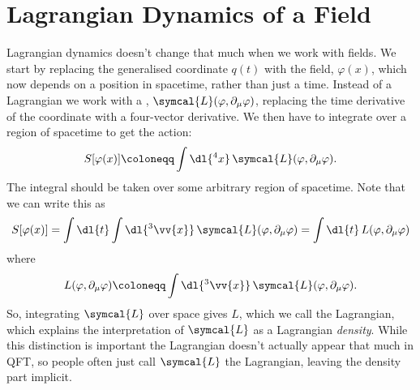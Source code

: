 \documentclass[fleqn]{NotesClass}
\newcommand{\lagrangian}{L}
\newcommand{\lagrangianDensity}{\symcal{L}}
\begin{document}
    \section{Lagrangian Dynamics of a Field}
    Lagrangian dynamics doesn't change that much when we work with fields.
    We start by replacing the generalised coordinate \(q(t)\) with the field, \(\varphi(x)\), which now depends on a position in spacetime, rather than just a time.
    Instead of a Lagrangian we work with a , \(\lagrangianDensity(\varphi, \partial_\mu \varphi)\), replacing the time derivative of the coordinate with a four-vector derivative.
    We then have to integrate over a region of spacetime to get the action:
    \begin{equation}
        S[\varphi(x)] \coloneqq \int \dl{^4x} \, \lagrangianDensity(\varphi, \partial_\mu \varphi).
    \end{equation}
    The integral should be taken over some arbitrary region of spacetime.
    Note that we can write this as
    \begin{equation}
        S[\varphi(x)] = \int \dl{t} \int \dl{^3\vv{x}} \, \lagrangianDensity(\varphi, \partial_\mu \varphi) = \int \dl{t} \, \lagrangian(\varphi, \partial_\mu \varphi)
    \end{equation}
    where
    \begin{equation}
        \lagrangian(\varphi, \partial_\mu \varphi) \coloneqq \int \dl{^3\vv{x}} \, \lagrangianDensity(\varphi, \partial_\mu \varphi).
    \end{equation}
    So, integrating \(\lagrangianDensity\) over space gives \(\lagrangian\), which we call the Lagrangian, which explains the interpretation of \(\lagrangianDensity\) as a Lagrangian \emph{density}.
    While this distinction is important the Lagrangian doesn't actually appear that much in QFT, so people often just call \(\lagrangianDensity\) the Lagrangian, leaving the density part implicit.
    
\end{document}
